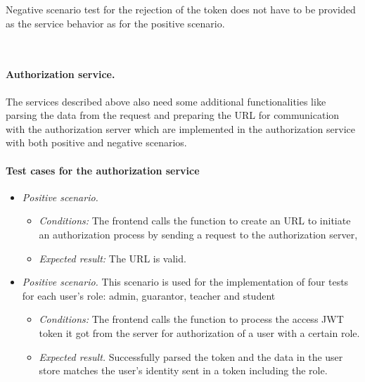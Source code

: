 \noindent Negative scenario test for the rejection of the token does not have to be provided as the service behavior as for the positive scenario.

\


\paragraph*{Authorization service.} The services described above also need some additional functionalities like parsing the data from the request and preparing the URL for communication with the authorization server which are implemented in the authorization service with both positive and negative scenarios. 


\paragraph*{Test cases for the authorization service} 
\begin{itemize}
    \item \emph{Positive scenario.} 
        \begin{itemize}
            \item \emph{Conditions:} The frontend calls the function to create an URL to initiate an authorization process by sending a request to the authorization server,
            \item \emph{Expected result:} The URL is valid.
        \end{itemize}
    \item \emph{Positive scenario.} This scenario is used for the implementation of four tests for each user's role: admin, guarantor, teacher and student
        \begin{itemize}
            \item \emph{Conditions:} The frontend calls the function to process the access JWT token it got from the server for authorization of a user with a certain role.
            \item \emph{Expected result.} Successfully parsed the token and the data in the user store matches the user's identity sent in a token including the role.
        \end{itemize}
\end{itemize}

\ 

